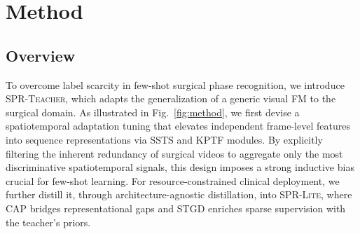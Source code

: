 

\section{Method}
\label{sec:method}





\subsection{Overview}
\label{sec:method:overview}


To overcome label scarcity in few-shot surgical phase recognition, we introduce \textsc{SPR-Teacher}, which adapts the generalization of a generic visual FM to the surgical domain.
As illustrated in Fig.~\ref{fig:method}, we first devise a spatiotemporal adaptation tuning that elevates independent frame-level features into sequence representations via SSTS and KPTF modules. By explicitly filtering the inherent redundancy of surgical videos to aggregate only the most discriminative spatiotemporal signals, this design imposes a strong inductive bias crucial for few-shot learning.
For resource-constrained clinical deployment, we further distill it, through architecture-agnostic distillation, into \textsc{SPR-Lite}, where CAP bridges representational gaps and STGD enriches sparse supervision with the teacher's priors.

